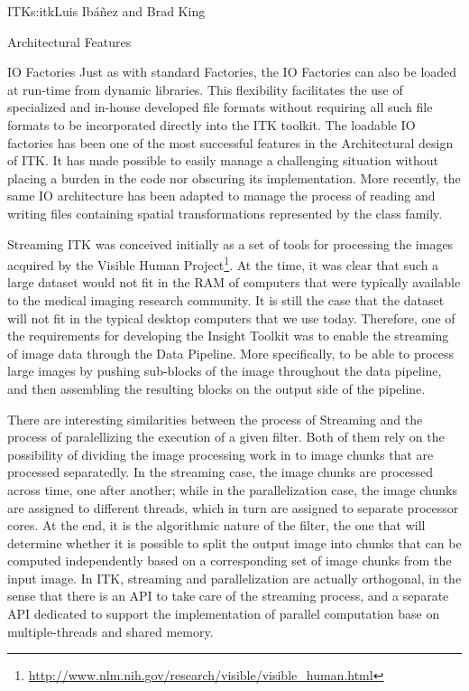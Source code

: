 \begin{aosachapter}{ITK}{s:itk}{Luis Ib\'{a}\~{n}ez and Brad King}
\begin{aosasect1}{Architectural Features}
\begin{aosasect2}{IO Factories}
Just as with standard Factories, the IO Factories can also be loaded at
run-time from dynamic libraries. This flexibility facilitates the use of
specialized and in-house developed file formats without requiring all such file
formats to be incorporated directly into the ITK toolkit. The loadable IO
factories has been one of the most successful features in the Architectural
design of ITK. It has made possible to easily manage a challenging situation
without placing a burden in the code nor obscuring its implementation. More
recently, the same IO architecture has been adapted to manage the process of
reading and writing files containing spatial transformations represented by the
 class family.

\end{aosasect2}

\begin{aosasect2}{Streaming}\label{sec.itk.streaming}
ITK was conceived initially as a set of tools for processing the images
acquired by the Visible Human
Project\footnote{\url{http://www.nlm.nih.gov/research/visible/visible_human.html}}.
At the time, it was clear that such a large dataset would not fit in the RAM of
computers that were typically available to the medical imaging research
community. It is still the case that the dataset will not fit in the typical
desktop computers that we use today. Therefore, one of the requirements for
developing the Insight Toolkit was to enable the streaming of image data
through the Data Pipeline. More specifically, to be able to process large
images by pushing sub-blocks of the image throughout the data pipeline, and then
assembling the resulting blocks on the output side of the pipeline.

There are interesting similarities between the process of Streaming
and the process of paralellizing the execution of a given filter. Both
of them rely on the possibility of dividing the image processing work
in to image chunks that are processed separatedly. In the streaming
case, the image chunks are processed across time, one after another;
while in the parallelization case, the image chunks are assigned to
different threads, which in turn are assigned to separate processor
cores. At the end, it is the algorithmic nature of the filter, the
one that will determine whether it is possible to split the output
image into chunks that can be computed independently based on a
corresponding set of image chunks from the input image. In ITK,
streaming and parallelization are actually orthogonal, in the sense
that there is an API to take care of the streaming process, and a
separate API dedicated to support the implementation of parallel
computation base on multiple-threads and shared memory.


\end{aosasect2}
\end{aosasect1}
\end{aosachapter}
